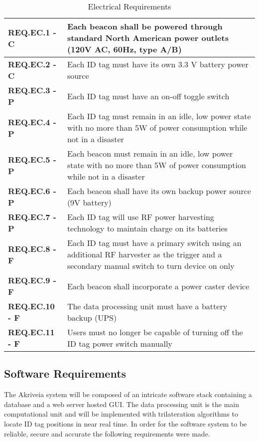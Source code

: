 \bgroup
\def\arraystretch{1.5}
\begin{table}[H]
\centering
\begin{tabular}{ | m{3.25cm} | m{12.5cm} |}
 \hline
 \textbf{REQ.EC.1 - C} & Each beacon shall be powered through standard North American power outlets (120V AC, 60Hz, type A/B) \\
\hline
 \textbf{REQ.EC.2 - C} & Each ID tag must have its own 3.3 V battery power source \\
\hline
 \textbf{REQ.EC.3 - P} & Each ID tag must have an on-off toggle switch  \\
\hline
 \textbf{REQ.EC.4 - P} &  Each ID tag must remain in an idle, low power state with no more than 5W of power consumption while not in a disaster  \\
\hline
 \textbf{REQ.EC.5 - P} &  Each beacon must remain in an idle, low power state with no more than 5W of power consumption while not in a disaster \\
\hline
 \textbf{REQ.EC.6 - P} & Each beacon shall have its own backup power source (9V battery)  \\
\hline
 \textbf{REQ.EC.7 - P} & Each ID tag will use RF power harvesting technology to maintain charge on its batteries \\
\hline
 \textbf{REQ.EC.8 - F} &  Each ID tag must have a primary switch using an additional RF harvester as the trigger and a secondary manual switch to turn device on only   \\
\hline
 \textbf{REQ.EC.9 - F} & Each beacon shall incorporate a power caster device \\
\hline
 \textbf{REQ.EC.10 - F} & The data processing unit must have a battery backup (UPS) \\
\hline
 \textbf{REQ.EC.11 - F} & Users must no longer be capable of turning off the ID tag power switch manually \\
\hline
\end{tabular}
\caption{Electrical Requirements}
\end{table}

\break
\subsection{Software Requirements}
The Akriveia system will be composed of an intricate software stack containing a database and a web server hosted GUI. The data processing unit is the main computational unit and will be implemented with trilateration algorithms to locate ID tag positions in near real time. In order for the software system to be reliable, secure and accurate the following requirements were made.


